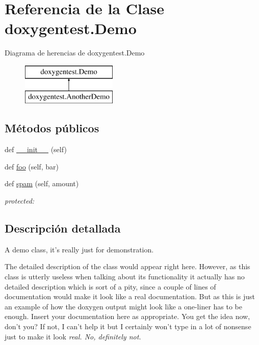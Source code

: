 \hypertarget{classdoxygentest_1_1_demo}{}\section{Referencia de la Clase doxygentest.\+Demo}
\label{classdoxygentest_1_1_demo}
Diagrama de herencias de doxygentest.\+Demo\begin{figure}[H]
\begin{center}
\leavevmode
\includegraphics[height=2.000000cm]{classdoxygentest_1_1_demo}
\end{center}
\end{figure}
\subsection*{Métodos públicos}
\begin{DoxyCompactItemize}
\item 
def \hyperlink{classdoxygentest_1_1_demo_ac9f60f8eb2c6f16f8ad7e95b0be53754}{\+\_\+\+\_\+init\+\_\+\+\_\+} (self)
\item 
def \hyperlink{classdoxygentest_1_1_demo_a2448af40a2cda534a3e299b0b355656b}{foo} (self, bar)
\item 
def \hyperlink{classdoxygentest_1_1_demo_a7f975bf8d98dc2400e3b9c696562926c}{spam} (self, amount)
\begin{DoxyCompactList}\small\item\em protected\+: \end{DoxyCompactList}\end{DoxyCompactItemize}


\subsection{Descripción detallada}
\begin{DoxyVerb}\brief A demo class, it's really just for demonstration.

The detailed description of the class would appear right here.
However, as this class is utterly useless when talking about its
functionality it actually has no detailed description which is
sort of a pity, since a couple of lines of documentation would
make it look like a real documentation. But as this is just an
example of how the doxygen output might look like a one-liner has
to be enough. Insert your documentation here as appropriate. You
get the idea now, don't you? If not, I can't help it but I
certainly won't type in a lot of nonsense just to make it look \em
real.  No, definitely not.
\end{DoxyVerb}
 

